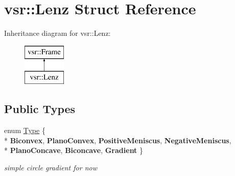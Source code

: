 \hypertarget{structvsr_1_1_lenz}{\section{vsr\-:\-:Lenz Struct Reference}
\label{structvsr_1_1_lenz}
}
Inheritance diagram for vsr\-:\-:Lenz\-:\begin{figure}[H]
\begin{center}
\leavevmode
\includegraphics[height=2.000000cm]{structvsr_1_1_lenz}
\end{center}
\end{figure}
\subsection*{Public Types}
\begin{DoxyCompactItemize}
\item 
enum \hyperlink{structvsr_1_1_lenz_acf6ae241e35039b0dbda7b4f03ae095c}{Type} \{ \\*
{\bfseries Biconvex}, 
{\bfseries Plano\-Convex}, 
{\bfseries Positive\-Meniscus}, 
{\bfseries Negative\-Meniscus}, 
\\*
{\bfseries Plano\-Concave}, 
{\bfseries Biconcave}, 
{\bfseries Gradient}
 \}
\begin{DoxyCompactList}\small\item\em simple circle gradient for now \end{DoxyCompactList}\end{DoxyCompactItemize}
